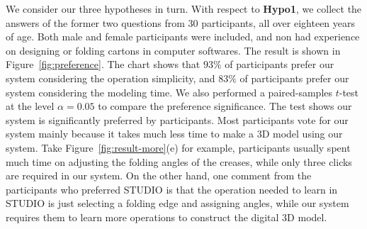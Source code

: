 




We consider our three hypotheses in turn. 
With respect to \textbf{Hypo1}, we collect the answers of the former two questions from 30 participants, all over eighteen years of age. Both male and female participants were included, and non had experience on designing or folding cartons in computer softwares. 
%
The result is shown in Figure~\ref{fig:preference}. 
The chart shows that $93\%$ of participants prefer our system considering the operation simplicity, and $83\%$ of participants prefer our system considering the modeling time.
%
We also performed a paired-samples $t$-test at the level $\alpha = 0.05$ to compare the preference significance.
%
The test shows our system is significantly preferred by participants.
%
Most participants vote for our system mainly because it takes much less time to make a 3D model using our system. 
Take Figure~\ref{fig:result-more}(e) for example, participants usually spent much time on adjusting the folding angles of the creases, while only three clicks are required in our system.
%
On the other hand, one comment from the participants who preferred STUDIO is that the operation needed to learn in STUDIO is just selecting a folding edge and assigning angles, while our system requires them to learn more operations to construct the digital 3D model. 
%



